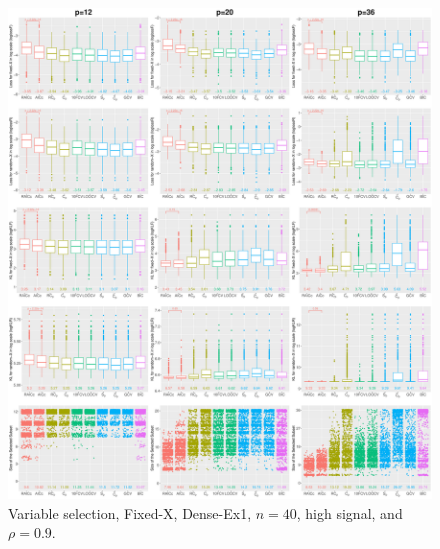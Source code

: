 \begin{figure}[!ht]
\centering
\includegraphics[width=\textwidth]{figures/supplement/fixedx/subset_selection/Dense-Ex1_n40_hsnr_rho09.eps}
\caption{Variable selection, Fixed-X, Dense-Ex1, $n=40$, high signal, and $\rho=0.9$.}
\end{figure}
\clearpage
